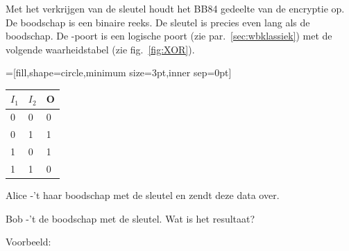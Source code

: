 \documentclass[../../main.tex]{subfiles}
\begin{document}
Met het verkrijgen van de sleutel houdt het BB84 gedeelte van de encryptie op. De boodschap is een binaire reeks. De sleutel is precies even lang als de boodschap.
De -poort is een logische poort (zie par.~\ref{sec:wbklassiek}) met de volgende waarheidstabel (zie fig.~\ref{fig:XOR}).

\begin{center}
\begin{minipage}[b]{.22\textwidth}
\begin{center}
=[fill,shape=circle,minimum size=3pt,inner sep=0pt]
\end{center}
\end{minipage}%
\hspace{0.25cm}
\begin{minipage}[b]{.22\textwidth}
{\scriptsize
\begin{tabular}{|l|l|l|}
\hline
$I_1$ & $I_2$ & O \\\hline
0    & 0  & 0 \\\hline
0    & 1  & 1 \\\hline
1    & 0  & 1 \\\hline
1    & 1  & 0 \\ \hline
\end{tabular}
}
\end{minipage}
\end{center}

Alice -'t haar boodschap met de sleutel en zendt deze data over. 

Bob -'t de boodschap met de sleutel. Wat is het resultaat?


Voorbeeld:
\end{document}
